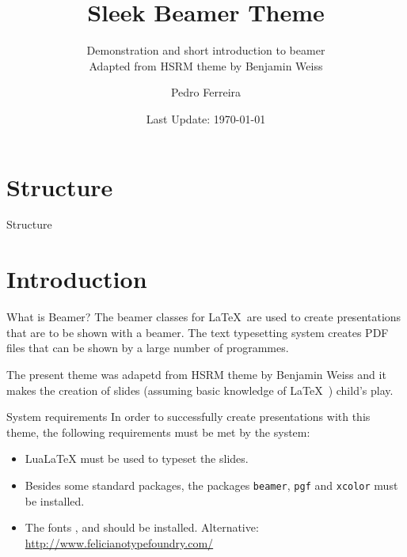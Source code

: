 \documentclass[compress,aspectratio=169]{beamer}
\title{Sleek Beamer Theme}
\subtitle{Demonstration and short introduction to beamer \\ {\small Adapted from HSRM theme by Benjamin Weiss}}
\date{Last Update: \today}
\author{Pedro Ferreira}
\institute{DEMEC\\ {\Medium FEUP}}
\begin{document}

\maketitle


\section*{Structure}
\begin{frame}{Structure}
	\tableofcontents[hideallsubsections]
\end{frame}

\section{Introduction}

\begin{frame}{What is Beamer?}
	The beamer classes for \LaTeX\ are used to create presentations that are to be shown with a beamer. The text typesetting system creates PDF files that can be shown by a large number of programmes.
	
	The present theme was adapetd from HSRM theme by Benjamin Weiss and it makes the creation of slides (assuming basic knowledge of \LaTeX\ ) child's play.
\end{frame}

\begin{frame}{System requirements}
	In order to successfully create presentations with this theme, the following requirements must be met by the system:
	\begin{itemize}
		\item LuaLaTeX must be used to typeset the slides.
		\item Besides some standard packages, the packages \texttt{beamer}, \texttt{pgf} and \texttt{xcolor} must be installed.
		\item The fonts ,  and  should be installed. Alternative: \\\url{http://www.felicianotypefoundry.com/}
	\end{itemize}
\end{frame}
\end{document}
